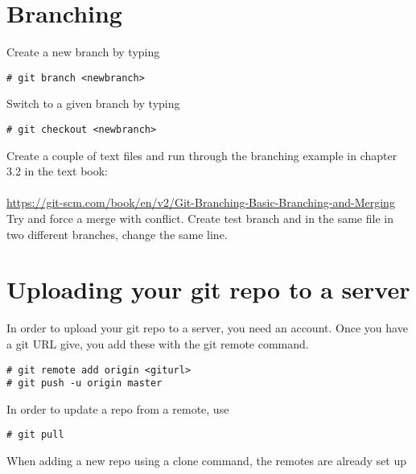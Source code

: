 \documentclass[10pt,a4paper]{article}
\begin{document}
\section{Branching}
Create a new branch by typing
\begin{lstlisting}
# git branch <newbranch>
\end{lstlisting}
Switch to a given branch by typing 
\begin{lstlisting}
# git checkout <newbranch>
\end{lstlisting}
Create a couple of text files and run through the branching example in chapter 3.2 in the text book:
\\\\
\url{https://git-scm.com/book/en/v2/Git-Branching-Basic-Branching-and-Merging}
Try and force a merge with conflict. Create test branch and in the same file in two different branches, change the same line.
\section{Uploading your git repo to a server}
In order to upload your git repo to a server, you need an account. Once you have a git URL give, you add these with the git remote command. 
\begin{lstlisting}
# git remote add origin <giturl>
# git push -u origin master
\end{lstlisting}
In order to update a repo from a remote, use
\begin{lstlisting}
# git pull
\end{lstlisting}
When adding a new repo using a clone command, the remotes are already set up
\end{document}
